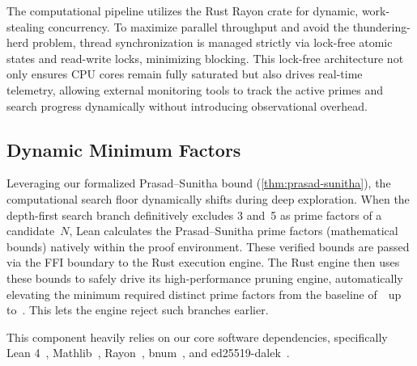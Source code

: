 The computational pipeline utilizes the Rust Rayon crate for dynamic,
work-stealing concurrency.  To maximize parallel throughput and avoid
the thundering-herd problem, thread synchronization is managed strictly
via lock-free atomic states and read-write locks, minimizing blocking.
This lock-free architecture not only ensures CPU cores remain fully
saturated but also drives real-time telemetry, allowing external
monitoring tools to track the active primes and search progress
dynamically without introducing observational overhead.

\subsection{Dynamic Minimum Factors}
\label{subsec:dynamic_minimum_factors}

Leveraging our formalized Prasad--Sunitha bound
(\cref{thm:prasad-sunitha}), the computational search floor dynamically
shifts during deep exploration.  When the depth-first search branch
definitively excludes 3 and~5 as prime factors of a candidate~$N$, Lean
calculates the Prasad--Sunitha prime factors (mathematical bounds) natively
within the proof environment. These verified bounds are passed via the FFI
boundary to the Rust execution engine. The Rust engine then uses these bounds
to safely drive its high-performance pruning engine, automatically elevating
the minimum required distinct prime factors from the baseline of~\TelemetryHagisBaselineMinPrimeFactors\
up to~\TelemetryPrasadSunithaBound. This lets the engine reject such branches earlier.


This component heavily relies on our core software dependencies, specifically Lean 4~\cite{moura2021}, Mathlib~\cite{mathlib2020}, Rayon~\cite{rayon2024}, bnum~\cite{bnum2024}, and ed25519-dalek~\cite{ed25519dalek2024}.
